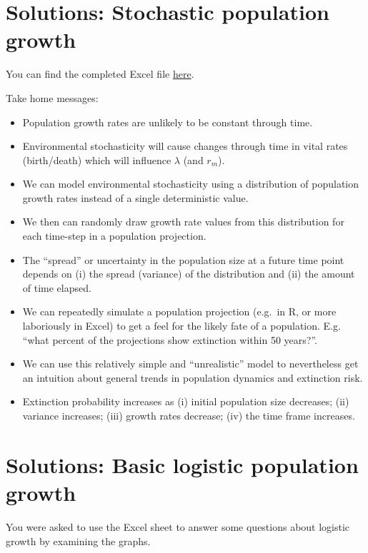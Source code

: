\documentclass[
  a4paper]{book}
\providecommand{\tightlist}{%
  \setlength{\itemsep}{0pt}\setlength{\parskip}{0pt}}
\begin{document}
\section{Solutions: Stochastic population growth}\label{solutions-stochastic-population-growth}

You can find the completed Excel file \href{https://www.dropbox.com/s/baao06vi0c0quns/StochasticPopulationGrowth-complete.xlsx?dl=1}{here}.

Take home messages:

\begin{itemize}
\tightlist
\item
  Population growth rates are unlikely to be constant through time.
\item
  Environmental stochasticity will cause changes through time in vital rates (birth/death) which will influence \(\lambda\) (and \(r_m\)).
\item
  We can model environmental stochasticity using a distribution of population growth rates instead of a single deterministic value.
\item
  We then can randomly draw growth rate values from this distribution for each time-step in a population projection.
\item
  The ``spread'' or uncertainty in the population size at a future time point depends on (i) the spread (variance) of the distribution and (ii) the amount of time elapsed.
\item
  We can repeatedly simulate a population projection (e.g.~in R, or more laboriously in Excel) to get a feel for the likely fate of a population. E.g. ``what percent of the projections show extinction within 50 years?''.
\item
  We can use this relatively simple and ``unrealistic'' model to nevertheless get an intuition about general trends in population dynamics and extinction risk.
\item
  Extinction probability increases as (i) initial population size decreases; (ii) variance increases; (iii) growth rates decrease; (iv) the time frame increases.
\end{itemize}

\section{Solutions: Basic logistic population growth}\label{solutions-basic-logistic-population-growth}

You were asked to use the Excel sheet to answer some questions about logistic growth by examining the graphs.
\end{document}
